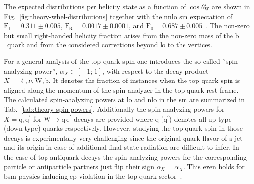 The expected distributions per helicity state as a function of $\cos\theta^\star_\mathrm{W}$ are shown in Fig.~\ref{fig:theory-whel-distributions} together with the \gls{nnlo} \gls{sm} expectation of $\mathrm{F}_\mathrm{L}=0.311\pm0.005$, $\mathrm{F}_\mathrm{R}=0.0017\pm0.0001$, and $\mathrm{F}_{0}=0.687\pm0.005$~\cite{Czarnecki:2010gb}. The non-zero but small right-handed helicity fraction arises from the non-zero mass of the $\mathrm{b}$~quark and from the considered corrections beyond \gls{lo} to the vertices.
 

For a general analysis of the top quark spin one introduces the so-called ``spin-analyzing power'', $\alpha_{X}\in[-1;\,1]$, with respect to the decay product $X=\ell,\nu,\mathrm{W},\mathrm{b}$. It denotes the fraction of instances when the top quark spin is aligned along the momentum of the spin analyzer in the top quark rest frame. The calculated spin-analyzing powers at \gls{lo} and \gls{nlo} in the \gls{sm} are summarized in Tab.~\ref{tab:theory-spin-powers}. Additionally the spin-analyzing powers for $X=\mathrm{q},\mathrm{q}^\prime$ for $\mathrm{W}\to \mathrm{q}\,\mathrm{q}^\prime$ decays are provided where $\mathrm{q}$ ($\mathrm{q}^\prime$) denotes all up-type (down-type) quarks respectively. However, studying the top quark spin in those decays is experimentally very challenging since the original quark flavor of a jet and its origin in case of additional final state radiation are difficult to infer. In the case of top antiquark decays the spin-analyzing powers for the corresponding particle or antiparticle partners just flip their sign $\alpha_{X}=\alpha_{\bar{X}}$. This even holds for \gls{bsm} physics inducing \gls{cp}-violation in the top quark sector~\cite{AguilarSaavedra:2010nx}. 


